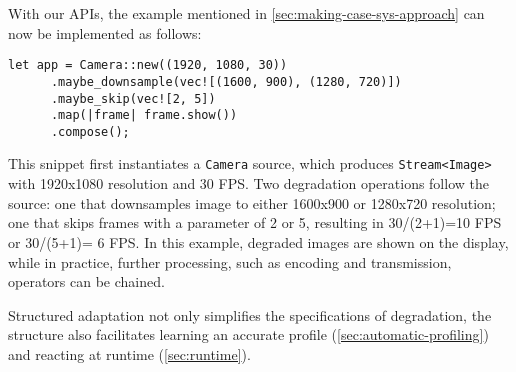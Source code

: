 With our APIs, the example mentioned in \autoref{sec:making-case-sys-approach}
can now be implemented as follows:

\vspace{-2pt}
\begin{lstlisting}[caption={Video Processing Example}, label={lst:ex}]
   let app = Camera::new((1920, 1080, 30))
      .maybe_downsample(vec![(1600, 900), (1280, 720)])
      .maybe_skip(vec![2, 5])
      .map(|frame| frame.show())
      .compose();
\end{lstlisting}

This snippet first instantiates a \texttt{Camera} source, which produces
\texttt{Stream<Image>} with 1920x1080 resolution and 30 FPS. Two degradation
operations follow the source: one that downsamples image to either 1600x900 or
1280x720 resolution; one that skips frames with a parameter of 2 or 5, resulting
in 30/(2+1)=10 FPS or 30/(5+1)= 6 FPS. In this example, degraded images are
shown on the display, while in practice, further processing, such as encoding
and transmission, operators can be chained.

Structured adaptation not only simplifies the specifications of degradation, the
structure also facilitates learning an accurate profile
(\autoref{sec:automatic-profiling}) and reacting at runtime
(\autoref{sec:runtime}).

